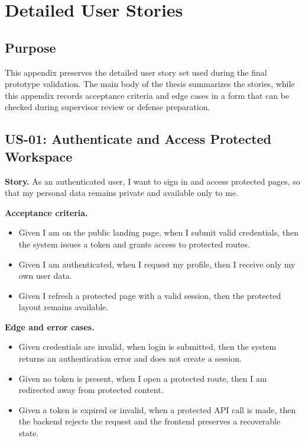 \chapter{Detailed User Stories}

\section{Purpose}

This appendix preserves the detailed user story set used during the final prototype validation. The main body of the thesis summarizes the stories, while this appendix records acceptance criteria and edge cases in a form that can be checked during supervisor review or defense preparation.

\section{US-01: Authenticate and Access Protected Workspace}

\textbf{Story.} As an authenticated user, I want to sign in and access protected pages, so that my personal data remains private and available only to me.

\textbf{Acceptance criteria.}
\begin{itemize}
  \item Given I am on the public landing page, when I submit valid credentials, then the system issues a token and grants access to protected routes.
  \item Given I am authenticated, when I request my profile, then I receive only my own user data.
  \item Given I refresh a protected page with a valid session, then the protected layout remains available.
\end{itemize}

\textbf{Edge and error cases.}
\begin{itemize}
  \item Given credentials are invalid, when login is submitted, then the system returns an authentication error and does not create a session.
  \item Given no token is present, when I open a protected route, then I am redirected away from protected content.
  \item Given a token is expired or invalid, when a protected API call is made, then the backend rejects the request and the frontend preserves a recoverable state.
\end{itemize}

